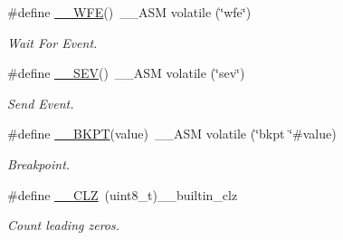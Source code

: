 \begin{DoxyCompactItemize}
\#define \mbox{\hyperlink{group___c_m_s_i_s___core___instruction_interface_gaf0330712223f4cfb6091e4ab84775f73}{\+\_\+\+\_\+\+W\+FE}}()~\+\_\+\+\_\+\+A\+SM volatile (\char`\"{}wfe\char`\"{})
\begin{DoxyCompactList}\small\item\em Wait For Event. \end{DoxyCompactList}\item 
\#define \mbox{\hyperlink{group___c_m_s_i_s___core___instruction_interface_gafa58e60fcd2176ad58f96947466ea1fa}{\+\_\+\+\_\+\+S\+EV}}()~\+\_\+\+\_\+\+A\+SM volatile (\char`\"{}sev\char`\"{})
\begin{DoxyCompactList}\small\item\em Send Event. \end{DoxyCompactList}\item 
\#define \mbox{\hyperlink{group___c_m_s_i_s___core___instruction_interface_ga15ea6bd3c507d3e81c3b3a1258e46397}{\+\_\+\+\_\+\+B\+K\+PT}}(value)~\+\_\+\+\_\+\+A\+SM volatile (\char`\"{}bkpt \char`\"{}\#value)
\begin{DoxyCompactList}\small\item\em Breakpoint. \end{DoxyCompactList}\item 
\#define \mbox{\hyperlink{group___c_m_s_i_s___core___instruction_interface_ga5d5bb1527e042be4a9fa5a33f65cc248}{\+\_\+\+\_\+\+C\+LZ}}~(uint8\+\_\+t)\+\_\+\+\_\+builtin\+\_\+clz
\begin{DoxyCompactList}\small\item\em Count leading zeros. \end{DoxyCompactList}\end{DoxyCompactItemize}
